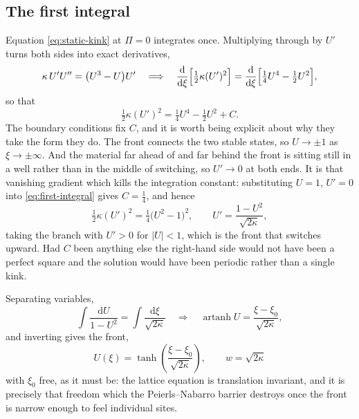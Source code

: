 \subsection*{The first integral}

Equation \eqref{eq:static-kink} at $\Pi = 0$ integrates once. Multiplying through
by $U'$ turns both sides into exact derivatives,
%
\begin{equation}
  \kappa\,U'U'' = \bigl(U^3 - U\bigr)U'
  \quad\Longrightarrow\quad
  \frac{\mathrm{d}}{\mathrm{d}\xi}\Bigl[\tfrac12 \kappa (U')^2\Bigr]
  = \frac{\mathrm{d}}{\mathrm{d}\xi}\Bigl[\tfrac14 U^4 - \tfrac12 U^2\Bigr],
\end{equation}
%
so that
%
\begin{equation}
  \tfrac12 \kappa (U')^2 = \tfrac14 U^4 - \tfrac12 U^2 + C.
  \label{eq:first-integral}
\end{equation}
%
The boundary conditions fix $C$, and it is worth being explicit about why they
take the form they do. The front connects the two stable states, so
$U \to \pm 1$ as $\xi \to \pm\infty$. And the material far ahead of and far
behind the front is sitting still in a well rather than in the middle of
switching, so $U' \to 0$ at both ends. It is that vanishing gradient which kills
the integration constant: substituting $U = 1$, $U' = 0$ into
\eqref{eq:first-integral} gives $C = \tfrac14$, and hence
%
\begin{equation}
  \tfrac12 \kappa (U')^2 = \tfrac14\bigl(U^2 - 1\bigr)^2,
  \qquad
  U' = \frac{1 - U^2}{\sqrt{2\kappa}} ,
\end{equation}
%
taking the branch with $U' > 0$ for $|U| < 1$, which is the front that switches
upward. Had $C$ been anything else the right-hand side would not have been a
perfect square and the solution would have been periodic rather than a single
kink.

Separating variables,
%
\begin{equation}
  \int \frac{\mathrm{d}U}{1 - U^2} = \int \frac{\mathrm{d}\xi}{\sqrt{2\kappa}}
  \quad\Longrightarrow\quad
  \operatorname{artanh} U = \frac{\xi - \xi_0}{\sqrt{2\kappa}},
\end{equation}
%
and inverting gives the front,
%
\begin{equation}
  \boxed{\;U(\xi) = \tanh\!\left(\frac{\xi - \xi_0}{\sqrt{2\kappa}}\right),
  \qquad w = \sqrt{2\kappa}\;}
  \label{eq:tanh}
\end{equation}
%
with $\xi_0$ free, as it must be: the lattice equation is translation invariant,
and it is precisely that freedom which the Peierls--Nabarro barrier destroys once
the front is narrow enough to feel individual sites.

